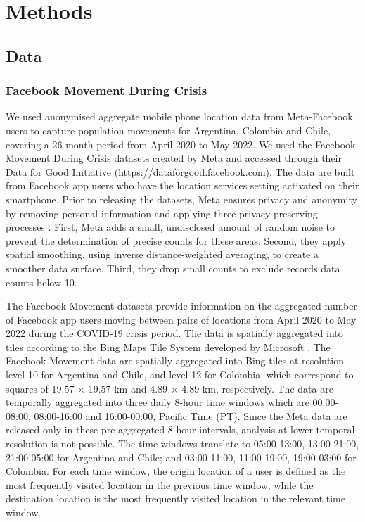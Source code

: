 \documentclass[fleqn,10pt]{wlscirep}
\begin{document}
\section*{Methods}

\subsection*{Data}

\subsubsection*{Facebook Movement During Crisis}

We used anonymised aggregate mobile phone location data from Meta-Facebook users to capture population movements for Argentina, Colombia and Chile, covering a 26-month period from April 2020 to May 2022. We used the Facebook Movement During Crisis datasets created by Meta and accessed through their Data for Good Initiative (\href{https://dataforgood.facebook.com}{https://dataforgood.facebook.com}). The data are built from Facebook app users who have the location services setting activated on their smartphone. Prior to releasing the datasets, Meta ensures privacy and anonymity by removing personal information and applying three privacy-preserving processes \cite{Maas19}. First, Meta adds a small, undisclosed amount of random noise to prevent the determination of precise counts for these areas.
Second, they apply spatial smoothing, using inverse distance-weighted averaging, to create a smoother data surface. Third, they drop small counts to exclude records data counts below 10.

The Facebook Movement datasets provide information on the aggregated number of Facebook app users moving between pairs of locations from April 2020 to May 2022 during the COVID-19 crisis period. The data is spatially aggregated into tiles according to the Bing Maps Tile System developed by Microsoft \cite{MicrosoftBingMaps}. The Facebook Movement data are spatially aggregated into Bing tiles at resolution level 10 for Argentina and Chile, and level 12 for Colombia, which correspond to squares of 19.57 $\times$ 19.57 km and 4.89 $\times$ 4.89 km, respectively. The data are temporally aggregated into three daily 8-hour time windows which are 00:00-08:00, 08:00-16:00 and 16:00-00:00, Pacific Time (PT). Since the Meta data are released only in these pre-aggregated 8-hour intervals, analysis at lower temporal resolution is not possible. The time windows translate to 05:00-13:00, 13:00-21:00, 21:00-05:00 for Argentina and Chile; and 03:00-11:00, 11:00-19:00, 19:00-03:00 for Colombia. For each time window, the origin location of a user is defined as the most frequently visited location in the previous time window, while the destination location is the most frequently visited location in the relevant time window.
\end{document}
